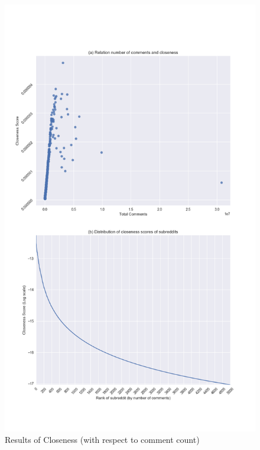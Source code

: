 \documentclass[bsc,frontabs,twoside,singlespacing,parskip,deptreport]{infthesis}
\begin{document}
\begin{figure}[p]
	\centering
  	\includegraphics[width=\textwidth]{closeness.png}
  	\caption{Results of Closeness (with respect to comment count)}
  	\label{fig:closeness}
\end{figure}
\end{document}
